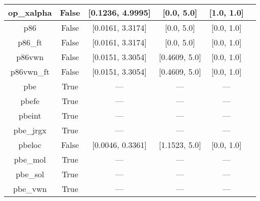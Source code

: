 \begin{tabular}{|c|c|c|c|c|l|}
    op\_xalpha &                 False & [0.1236, 4.9995] &       [0.0, 5.0] &     [1.0, 1.0] &                      \cite{Tsuneda1999_10664,Tsuneda1999_5656} \\ \hline
           p86 &                 False & [0.0161, 3.3174] &       [0.0, 5.0] &     [0.0, 1.0] &                                         \cite{Perdew1986_8822} \\ \hline
       p86\_ft &                 False & [0.0161, 3.3174] &       [0.0, 5.0] &     [0.0, 1.0] &                                         \cite{Perdew1986_8822} \\ \hline
        p86vwn &                 False & [0.0151, 3.3054] &    [0.4609, 5.0] &     [0.0, 1.0] &                                         \cite{Perdew1986_8822} \\ \hline
    p86vwn\_ft &                 False & [0.0151, 3.3054] &    [0.4609, 5.0] &     [0.0, 1.0] &                                         \cite{Perdew1986_8822} \\ \hline
           pbe &                  True &              --- &              --- &            --- &                     \cite{Perdew1996_3865,Perdew1996_3865_err} \\ \hline
         pbefe &                  True &              --- &              --- &            --- &                                          \cite{Perez2015_3844} \\ \hline
        pbeint &                  True &              --- &              --- &            --- &                                      \cite{Fabiano2010_113104} \\ \hline
     pbe\_jrgx &                  True &              --- &              --- &            --- &                                      \cite{Pedroza2009_201106} \\ \hline
        pbeloc &                 False & [0.0046, 0.3361] &    [1.1523, 5.0] &     [0.0, 1.0] &                                   \cite{Constantin2012_035130} \\ \hline
      pbe\_mol &                  True &              --- &              --- &            --- &                                     \cite{delCampo2012_104108} \\ \hline
      pbe\_sol &                  True &              --- &              --- &            --- &                                       \cite{Perdew2008_136406} \\ \hline
      pbe\_vwn &                  True &              --- &              --- &            --- & \cite{Kraisler2010_042516,Perdew1996_3865,Perdew1996_3865_err} \\ \hline

\end{tabular}
